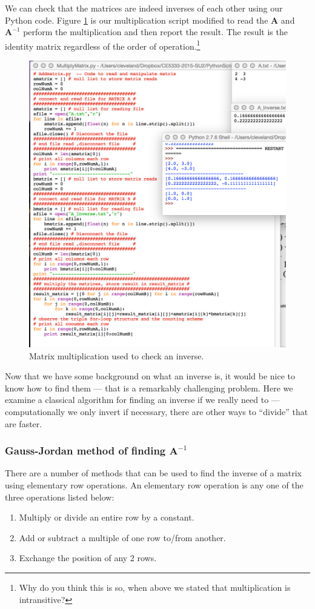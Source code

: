We can check that the matrices are indeed inverses of each other using our Python code.  
Figure \ref{fig:InverseMatrixCheck} is our multiplication script modified to read the $\mathbf{A}$ and $\mathbf{A}^{-1}$
perform the multiplication and then report the result.   
The result is the identity matrix regardless of the order of operation.\footnote{Why do you think this is so, when above we stated that multiplication is intransitive?}

\begin{figure}[h!] %
   \centering
   \includegraphics[width=5in]{./9-Matrix/InverseMatrixCheck.jpg} 
   \caption{Matrix multiplication used to check an inverse.}
   \label{fig:InverseMatrixCheck}
\end{figure}
\clearpage

Now that we have some background on what an inverse is, it would be nice to know how to find them --- that is a remarkably challenging problem.   Here we examine a classical algorithm for finding an inverse if we really need to --- computationally we only invert if necessary, there are other ways to ``divide'' that are faster.

\subsubsection{Gauss-Jordan method of finding $\mathbf{A}^{-1}$}
There are a number of methods that can be used to find the inverse of a matrix using elementary row operations.  
An elementary row operation is any one of the three operations listed below:
\begin{enumerate}
\item Multiply or divide an entire row by a constant.
\item Add or subtract a multiple of one row to/from another.
\item Exchange the position of any 2 rows.
\end{enumerate}

